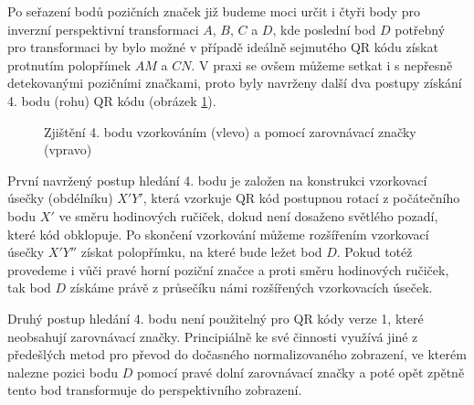 Po seřazení bodů pozičních značek již budeme moci určit i čtyři body pro
inverzní perspektivní transformaci $A$, $B$, $C$ a $D$, kde poslední bod $D$
potřebný pro transformaci by bylo možné v případě ideálně sejmutého QR kódu získat protnutím
polopřímek $AM$ a $CN$. V praxi se ovšem můžeme setkat i s nepřesně detekovanými
pozičními značkami, proto byly navrženy další dva postupy získání 4. bodu (rohu)
QR kódu (obrázek \ref{DeterminingTheFourthPointForTransformation}).	

\begin{figure}[H]
  \begin{center}
    \caption{Zjištění 4. bodu vzorkováním (vlevo) a pomocí zarovnávací značky
    (vpravo)}
    \label{DeterminingTheFourthPointForTransformation}
  \end{center}
\end{figure}

První navržený postup hledání 4. bodu je založen na konstrukci vzorkovací úsečky
(obdélníku) $X'Y'$, která vzorkuje QR kód postupnou rotací z počátečního bodu 
$X'$ ve směru hodinových ručiček, dokud není dosaženo světlého pozadí, které
kód obklopuje. Po skončení vzorkování můžeme rozšířením vzorkovací úsečky 
$X'Y''$ získat polopřímku, na které bude ležet bod $D$. Pokud totéž provedeme i
vůči pravé horní poziční značce a proti směru hodinových ručiček, tak bod $D$
získáme právě z průsečíku námi rozšířených vzorkovacích úseček.

Druhý postup hledání 4. bodu není použitelný pro QR kódy verze 1, které
neobsahují zarovnávací značky. Principiálně ke své činnosti využívá jiné 
z předešlých metod pro převod do dočasného normalizovaného zobrazení, ve
kterém nalezne pozici bodu $D$ pomocí pravé dolní zarovnávací značky a poté
opět zpětně tento bod transformuje do perspektivního zobrazení.

